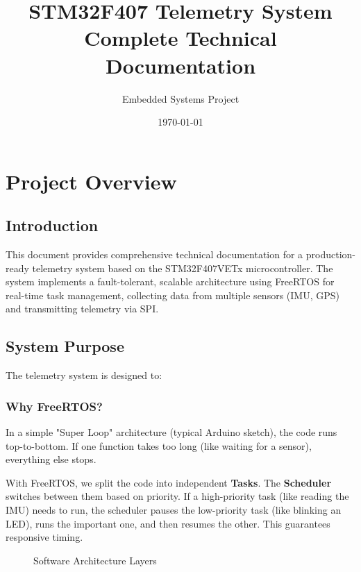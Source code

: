 \documentclass[11pt,a4paper]{article}
\title{STM32F407 Telemetry System\\Complete Technical Documentation}
\author{Embedded Systems Project}
\date{\today}
\begin{document}
\maketitle
\tableofcontents
\newpage

\section{Project Overview}

\subsection{Introduction}
This document provides comprehensive technical documentation for a production-ready telemetry system based on the STM32F407VETx microcontroller. The system implements a fault-tolerant, scalable architecture using FreeRTOS for real-time task management, collecting data from multiple sensors (IMU, GPS) and transmitting telemetry via SPI.

\subsection{System Purpose}
The telemetry system is designed to:
\subsubsection{Why FreeRTOS?}
In a simple "Super Loop" architecture (typical Arduino sketch), the code runs top-to-bottom. If one function takes too long (like waiting for a sensor), everything else stops. 

With FreeRTOS, we split the code into independent \textbf{Tasks}. The \textbf{Scheduler} switches between them based on priority. If a high-priority task (like reading the IMU) needs to run, the scheduler pauses the low-priority task (like blinking an LED), runs the important one, and then resumes the other. This guarantees responsive timing.

\begin{figure}[H]
\centering
{}
\caption{Software Architecture Layers}
\end{figure}
\end{document}
